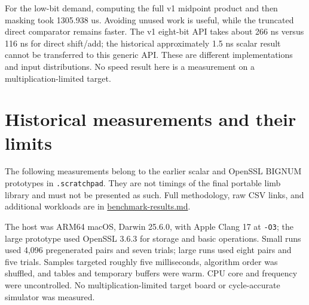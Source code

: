 \documentclass[11pt,a4paper]{article}
\begin{document}
For the low-bit demand, computing the full v1 midpoint product and then masking took 1305.938 us. Avoiding unused work is useful, while the truncated direct comparator remains faster. The v1 eight-bit API takes about 266 ns versus 116 ns for direct shift/add; the historical approximately 1.5 ns scalar result cannot be transferred to this generic API. These are different implementations and input distributions. No speed result here is a measurement on a multiplication-limited target.

\section{Historical measurements and their limits}

The following measurements belong to the earlier scalar and OpenSSL BIGNUM prototypes in \texttt{.scratchpad}. They are not timings of the final portable limb library and must not be presented as such. Full methodology, raw CSV links, and additional workloads are in \href{\detokenize{benchmark-results.md}}{benchmark-results.md}.

The host was ARM64 macOS, Darwin 25.6.0, with Apple Clang 17 at \texttt{-O3}; the large prototype used OpenSSL 3.6.3 for storage and basic operations. Small runs used 4,096 pregenerated pairs and seven trials; large runs used eight pairs and five trials. Samples targeted roughly five milliseconds, algorithm order was shuffled, and tables and temporary buffers were warm. CPU core and frequency were uncontrolled. No multiplication-limited target board or cycle-accurate simulator was measured.
\end{document}
